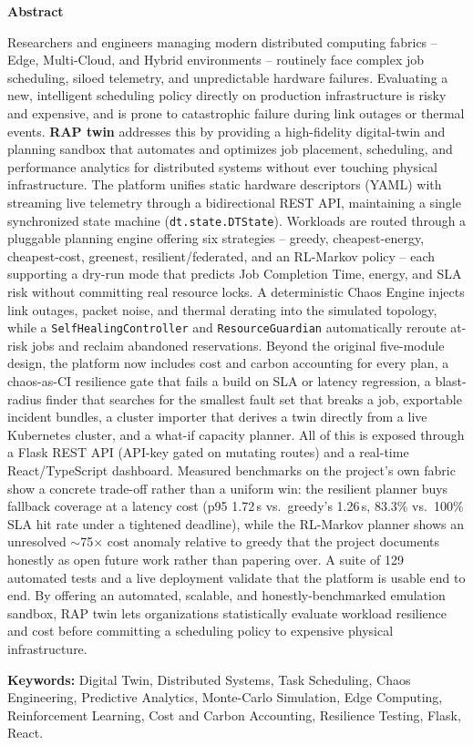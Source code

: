 \begin{center}
\bfseries \fontsize{24}{12} \selectfont Abstract
\end{center}
\vspace*{1\baselineskip}
Researchers and engineers managing modern distributed computing fabrics -- Edge, Multi-Cloud, and Hybrid environments -- routinely face complex job scheduling, siloed telemetry, and unpredictable hardware failures. Evaluating a new, intelligent scheduling policy directly on production infrastructure is risky and expensive, and is prone to catastrophic failure during link outages or thermal events. \textbf{RAP twin} addresses this by providing a high-fidelity digital-twin and planning sandbox that automates and optimizes job placement, scheduling, and performance analytics for distributed systems without ever touching physical infrastructure. The platform unifies static hardware descriptors (YAML) with streaming live telemetry through a bidirectional REST API, maintaining a single synchronized state machine (\texttt{dt.state.DTState}). Workloads are routed through a pluggable planning engine offering six strategies -- greedy, cheapest-energy, cheapest-cost, greenest, resilient/federated, and an RL-Markov policy -- each supporting a dry-run mode that predicts Job Completion Time, energy, and SLA risk without committing real resource locks. A deterministic Chaos Engine injects link outages, packet noise, and thermal derating into the simulated topology, while a \texttt{SelfHealingController} and \texttt{ResourceGuardian} automatically reroute at-risk jobs and reclaim abandoned reservations. Beyond the original five-module design, the platform now includes cost and carbon accounting for every plan, a chaos-as-CI resilience gate that fails a build on SLA or latency regression, a blast-radius finder that searches for the smallest fault set that breaks a job, exportable incident bundles, a cluster importer that derives a twin directly from a live Kubernetes cluster, and a what-if capacity planner. All of this is exposed through a Flask REST API (API-key gated on mutating routes) and a real-time React/TypeScript dashboard. Measured benchmarks on the project's own fabric show a concrete trade-off rather than a uniform win: the resilient planner buys fallback coverage at a latency cost (p95 1.72\,s vs.\ greedy's 1.26\,s, 83.3\% vs.\ 100\% SLA hit rate under a tightened deadline), while the RL-Markov planner shows an unresolved $\sim$75$\times$ cost anomaly relative to greedy that the project documents honestly as open future work rather than papering over. A suite of 129 automated tests and a live deployment validate that the platform is usable end to end. By offering an automated, scalable, and honestly-benchmarked emulation sandbox, RAP twin lets organizations statistically evaluate workload resilience and cost before committing a scheduling policy to expensive physical infrastructure.

\vspace*{0.5\baselineskip}
\noindent\textbf{Keywords:} Digital Twin, Distributed Systems, Task Scheduling, Chaos Engineering, Predictive Analytics, Monte-Carlo Simulation, Edge Computing, Reinforcement Learning, Cost and Carbon Accounting, Resilience Testing, Flask, React.
